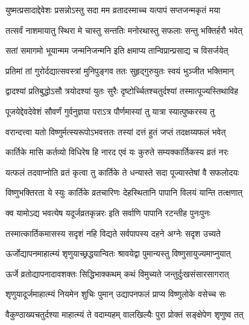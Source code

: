 \twolineshloka
{युष्मत्प्रसादाद्देवेशः प्रसन्नोऽस्तु सदा मम}
{व्रतादस्माच्च यत्पापं सप्तजन्मकृतं मया} %

\twolineshloka
{तत्सर्वं नाशमायातु स्थिरा मे चास्तु सन्ततिः}
{मनोरथास्तु सफलाः सन्तु भक्तिर्हरौ भवेत्} %

\twolineshloka
{सतां समागमो भूयान्मम जन्मनिजन्मनि}
{इति क्षमाप्य तान्विप्रान्प्रसाद्य च विसर्जयेत्} %

\twolineshloka
{प्रतिमां तां गुरोर्दद्यात्सवस्त्रां मुनिपुङ्गव}
{ततः सुहृद्गुरुयुतः स्वयं भुञ्जीत भक्तिमान्} %

\twolineshloka
{द्वादश्यां प्रतिबुद्धोऽसौ त्रयोदश्यां युतः सुरैः}
{दृष्टोर्च्चितश्चतुर्दश्यां तस्मात्पूज्यस्तिथाविह} %

\twolineshloka
{पूजयेद्देवदेवेशं सौवर्णं गुर्वनुज्ञया}
{पराऽत्र पौर्णमास्यां तु यात्रा स्यात्पुष्करस्य तु} %

\twolineshloka
{वरान्दत्त्वा यतो विष्णुर्मत्स्यरूपोऽभवत्ततः}
{तस्यां दत्तं हुतं जप्तं तदक्षय्यफलं भवेत्} %

\twolineshloka
{कार्तिके मासि कर्तव्यो विधिरेष हि नारद}
{एवं यः कुरुते सम्यक्कार्तिकस्य व्रतं नरः} %

\twolineshloka
{यत्फलं तदवाप्नोति व्रतं कृत्वा तु कार्तिके}
{ते धन्यास्ते सदा पूज्यास्तेषां वै सफलोदयः} %

\twolineshloka
{विष्णुभक्तिरता ये स्युः कार्तिके व्रतचारिणः}
{देहस्थितानि पापानि विलयं यान्ति तत्क्षणात्} %

\twolineshloka
{क्व यामोऽद्य भवत्येष यदूर्जव्रतकृन्नरः}
{इति सर्वाणि पापानि रटन्तीह पुनःपुनः} %

\twolineshloka
{तस्मात्कार्तिकमासस्य सदृशं नहि विद्यते}
{सर्वपापस्य दहने अग्नेः सदृश उच्यते} %

\twolineshloka
{ऊर्जोद्यापनमाहात्म्यं शृणुयाच्छ्रद्धयान्वितः}
{श्रावयेद्वा पुमान्यस्तु विष्णुसायुज्यमाप्नुयात्} %


\twolineshloka
{ऊर्जे व्रतोद्यापनादावशक्तः सिद्धिभाक्कथम्}
{कथं विमुच्यते जन्तुर्दुःखसंसारसागरात्} %


\twolineshloka
{शृणुयादूर्जमाहात्म्यं नियमेन शुचिः पुमान्}
{उद्यापनफलं प्राप्य विष्णुलोके वसेच्च सः} %





\twolineshloka
{वैकुण्ठाख्यचतुर्दश्या माहात्म्यं ते वदाम्यहम्}
{वालखिल्यैः पुरा प्रोक्तं सङ्क्षेपेण शृणुष्व तत्} %


